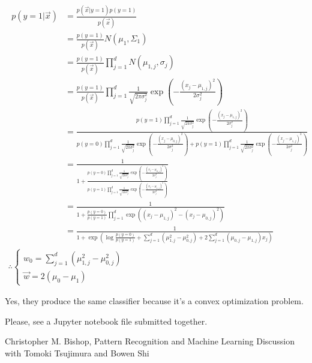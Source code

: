 \documentclass{introtosml}
\newcommand{\x}{\vec{x}}
\newcommand{\w}{\vec{w}}
\newcommand\expp[1]{\exp\left(#1\right)}
\newcommand\gauss[1]{\prod_{j=1}^d \frac{1}{\sqrt{2 \pi \sigma_j^2}} \expp{- \frac{(x_j - \mu_{#1,j})^2}{2 \sigma_j^2}}}
\newcommand\cgauss[1]{p(y=#1)\gauss{#1}}
\newcommand\pbias{\frac{p(y=0)}{p(y=1)}}
\begin{document}
\maketitle

\begin{p}
  \item
    \begin{gather*}
      \begin{aligned}
        p(y=1|\x)
        & = \frac{p(\x|y=1)p(y=1)}{p(\x)} \\
        & = \frac{p(y=1)}{p(\x)} N(\mu_1, \Sigma_1) \\
        & = \frac{p(y=1)}{p(\x)} \prod_{j=1}^d N(\mu_{1,j}, \sigma_j) \\
        & = \frac{p(y=1)}{p(\x)} \gauss{1} \\
        & = \frac{\cgauss{1}}{\cgauss{0} + \cgauss{1}} \\
        & = \frac{1}{1 + \frac{\cgauss{0}}{\cgauss{1}}} \\
        & = \frac{1}{1 + \pbias \prod_{j=1}^d \expp{(x_j - \mu_{1,j})^2 - (x_j - \mu_{0,j})^2}} \\
        & = \frac{1}{1 +
            \expp{\log \pbias + \sum_{j=1}^d (\mu_{1,j}^2 - \mu_{0,j}^2)
            + 2 \sum_{j=1}^d (\mu_{0,j} - \mu_{1,j}) x_j}}
      \end{aligned} \\
      \therefore \begin{cases}
        w_0 = \sum_{j=1}^d (\mu_{1,j}^2 - \mu_{0,j}^2) \\
        \w = 2 (\mu_0 - \mu_1)
      \end{cases}
    \end{gather*}

  \item
    Yes, they produce the same classifier because it's a convex optimization problem.

  \item
    Please, see a Jupyter notebook file submitted together.
\end{p}

\begin{thebibliography}{9}
   Christopher M. Bishop, Pattern Recognition and Machine Learning
   Discussion with Tomoki Tsujimura and Bowen Shi
\end{thebibliography}
\end{document}
